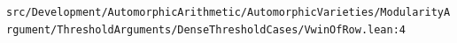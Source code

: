 \nolinkurl{src/Development/AutomorphicArithmetic/AutomorphicVarieties/ModularityArgument/ThresholdArguments/DenseThresholdCases/VwinOfRow.lean:4}%
